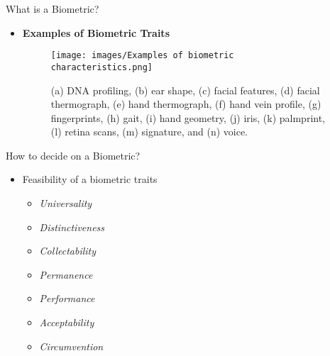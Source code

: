 \begin{frame}[t]{What is a Biometric?}
	\topline
    \begin{itemize}
    	\item \textcolor{navy_theme}{\textbf{Examples of Biometric Traits}}
			\begin{figure}[!ht]
				\centering 
				\texttt{[image: images/Examples of biometric characteristics.png]}
				\caption{(a) DNA profiling, (b) ear shape, (c) facial features, (d) facial thermograph, (e) hand thermograph, (f) hand vein profile, (g) fingerprints, (h) gait, (i) hand geometry, (j) iris, (k) palmprint, (l) retina scans, (m) signature, and (n) voice.}
				\label{fig:bio_ex}
			\end{figure}
		\end{itemize}
\end{frame}

\begin{frame}[t]{How to decide on a Biometric?}
	\topline
	\centering
    \begin{itemize}
		\item Feasibility of a biometric traits \cite{Unar2014}
		\vspace{1em}
		\begin{itemize}
			\setlength\itemsep{1em}

		    \item \textit{Universality}
		    \item \textit{Distinctiveness}
		    \item \textit{Collectability}
		    \item \textit{Permanence}
		    \item \textit{Performance}
		    \item \textit{Acceptability}
		    \item \textit{Circumvention}
		\end{itemize}
	\end{itemize}
\end{frame}

